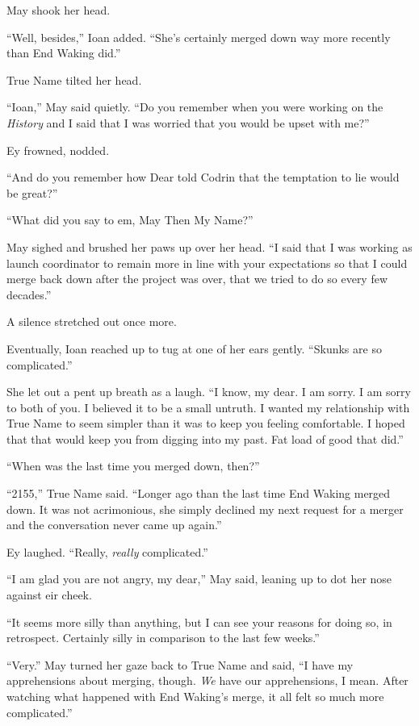 May shook her head.

``Well, besides,'' Ioan added. ``She's certainly merged down way more recently than End Waking did.''

True Name tilted her head.

``Ioan,'' May said quietly. ``Do you remember when you were working on the \emph{History} and I said that I was worried that you would be upset with me?''

Ey frowned, nodded.

``And do you remember how Dear told Codrin that the temptation to lie would be great?''

``What did you say to em, May Then My Name?''

May sighed and brushed her paws up over her head. ``I said that I was working as launch coordinator to remain more in line with your expectations so that I could merge back down after the project was over, that we tried to do so every few decades.''

A silence stretched out once more.

Eventually, Ioan reached up to tug at one of her ears gently. ``Skunks are so complicated.''

She let out a pent up breath as a laugh. ``I know, my dear. I am sorry. I am sorry to both of you. I believed it to be a small untruth. I wanted my relationship with True Name to seem simpler than it was to keep you feeling comfortable. I hoped that that would keep you from digging into my past. Fat load of good that did.''

``When was the last time you merged down, then?''

``2155,'' True Name said. ``Longer ago than the last time End Waking merged down. It was not acrimonious, she simply declined my next request for a merger and the conversation never came up again.''

Ey laughed. ``Really, \emph{really} complicated.''

``I am glad you are not angry, my dear,'' May said, leaning up to dot her nose against eir cheek.

``It seems more silly than anything, but I can see your reasons for doing so, in retrospect. Certainly silly in comparison to the last few weeks.''

``Very.'' May turned her gaze back to True Name and said, ``I have my apprehensions about merging, though. \emph{We} have our apprehensions, I mean. After watching what happened with End Waking's merge, it all felt so much more complicated.''

